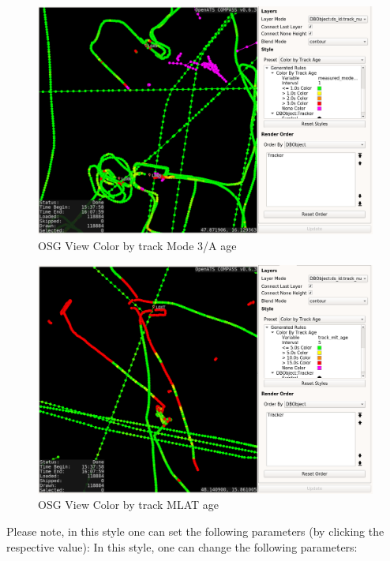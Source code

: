 \begin{figure}[H]
    \hspace*{-2.5cm}
    \includegraphics[width=19cm,frame]{figures/osgview_style_track_m3a_age.png}
  \caption{OSG View Color by track Mode 3/A age}
\end{figure}

\begin{figure}[H]
    \hspace*{-2.5cm}
    \includegraphics[width=19cm,frame]{figures/osgview_style_track_mlt_age.png}
  \caption{OSG View Color by track MLAT age}
\end{figure}

Please note, in this style one can set the following parameters (by clicking the respective value):
In this style, one can change the following parameters:

